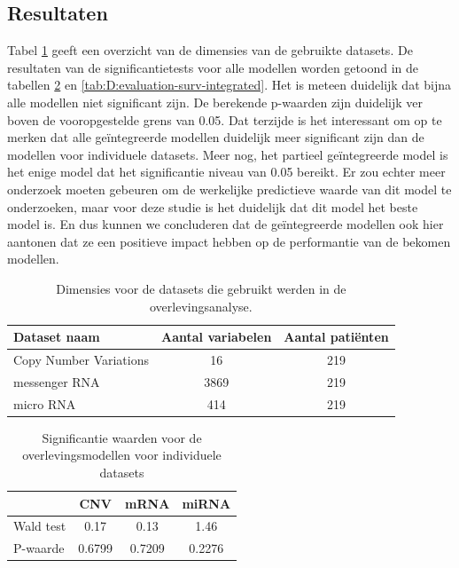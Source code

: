 \begin{abstract*}
\subsection{Resultaten}
Tabel \ref{tab:D:evaluation-case2-dimensions} geeft een overzicht van de dimensies van de gebruikte datasets. De resultaten van de significantietests voor alle modellen worden getoond in de tabellen \ref{tab:D:evaluation-surv-individual} en \ref{tab:D:evaluation-surv-integrated}. Het is meteen duidelijk dat bijna alle modellen niet significant zijn. De berekende p-waarden zijn duidelijk ver boven de vooropgestelde grens van 0.05. Dat terzijde is het interessant om op te merken dat alle ge\"integreerde modellen duidelijk meer significant zijn dan de modellen voor individuele datasets. Meer nog, het partieel ge\"integreerde model is het enige model dat het significantie niveau van 0.05 bereikt. Er zou echter meer onderzoek moeten gebeuren om de werkelijke predictieve waarde van dit model te onderzoeken, maar voor deze studie is het duidelijk dat dit model het beste model is. En dus kunnen we concluderen dat de ge\"integreerde modellen ook hier aantonen dat ze een positieve impact hebben op de performantie van de bekomen modellen.
\begin{table}
	\centering
	\begin{tabular}{lcc}
		\toprule
		Dataset naam & Aantal variabelen & Aantal pati\"enten \\
		\midrule
		Copy Number Variations & 16 & 219\\
		messenger RNA & 3869 & 219 \\
		micro RNA & 414 & 219 \\
		\bottomrule
	\end{tabular}
	\caption{Dimensies voor de datasets die gebruikt werden in de overlevingsanalyse.}
	\label{tab:D:evaluation-case2-dimensions}
\end{table}

\begin{table}
	\centering
	\begin{tabular}{lccc}
		\toprule
		& CNV    & mRNA & miRNA \\
		\midrule
		Wald test 					& 0.17 & 0.13  & 1.46 \\
		P-waarde 					& 0.6799 & 0.7209  & 0.2276 \\
		\bottomrule
	\end{tabular}
	\caption{Significantie waarden voor de overlevingsmodellen voor individuele datasets}
	\label{tab:D:evaluation-surv-individual}
\end{table}


\end{abstract*}
